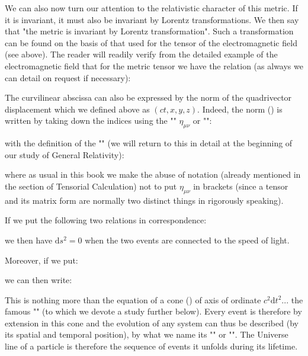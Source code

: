 	We can also now turn our attention to the relativistic character of this metric. If it is invariant, it must also be invariant by Lorentz transformations. We then say that "the metric is invariant by Lorentz transformation". Such a transformation can be found on the basis of that used for the tensor of the electromagnetic field (see above). The reader will readily verify from the detailed example of the electromagnetic field that for the metric tensor we have the relation (as always we can detail on request if necessary):
	
	The curvilinear abscissa can also be expressed by the norm of the quadrivector displacement which we defined above as $(ct,x,y,z)$. Indeed, the norm () is written by taking down the indices using the "\label{minkowski metric}" $\eta_{\mu\nu}$ or "":
	
	with the definition of the "" (we will return to this in detail at the beginning of our study of General Relativity):
	
	where as usual in this book we make the abuse of notation (already mentioned in the section of Tensorial Calculation) not to put $\eta_{\mu\nu}$ in brackets (since a tensor and its matrix form are normally two distinct things in rigorously speaking).

	If we put the following two relations in correspondence:
	
	we then have $\mathrm{d}s^2=0$ when the two events are connected to the speed of light.

	Moreover, if we put:
	
	we can then write:
	
	This is nothing more than the equation of a cone () of axis of ordinate $c^2\mathrm{d}t^2$... the famous "" (to which we devote a study further below). Every event is therefore by extension in this cone and the evolution of any system can thus be described (by its spatial and temporal position), by what we name its "" or "\label{world line}". The Universe line of a particle is therefore the sequence of events it unfolds during its lifetime.
	
